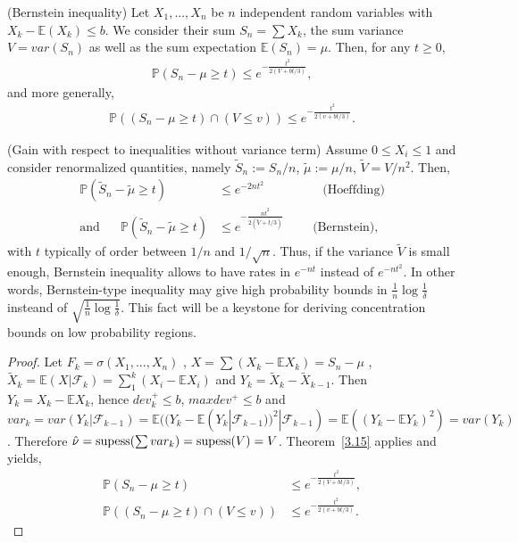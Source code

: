 \begin{proposition} ({\sc Bernstein inequality})
\label{Bernstein}
Let $X_1,...,X_n$ be $n$ independent random variables with $X_k-\mathbb{E}(X_k) \leq b$. We consider their sum $S_n=\sum X_k$, the sum variance $V=var(S_n)$ as well as the sum expectation $\mathbb{E}(S_n)=\mu$. Then, for any $t \ge 0$,
\begin{align*}
\mathbb{P}(S_n-\mu \geq t) \leq e^{-\frac{t^2}{2(V+bt/3)}},
\end{align*} 
and more generally,
\begin{align*}
\mathbb{P}((S_n-\mu \geq t)\cap(V \leq v)) \leq e^{-\frac{t^2}{2(v+bt/3)}}.
\end{align*} 
\end{proposition}

\begin{remark}({\sc Gain with respect to inequalities without variance term})
Assume $0 \le X_i \le 1$ and consider renormalized quantities, namely $\tilde S_n := S_n/n$, $\tilde \mu:= \mu/n$, $\tilde V = V/n^2$. Then,
\begin{align*}
\mathbb{P}(\tilde S_n-\tilde \mu \geq t) &\leq e^{-2nt^2} \text{~~~~~~~~~~~~~~(Hoeffding)}\\
\text{and~~~~~}\mathbb{P}(\tilde S_n-\tilde \mu \ge t) &\leq e^{-\frac{n t^2}{2(\tilde V+t/3)}} \text{~~~~~~~(Bernstein)},
\end{align*}
with $t$ typically of order between $1/n$ and $1/\sqrt n$. Thus, if the variance $\tilde V$ is small enough, Bernstein inequality allows to have rates in $e^{-nt}$ instead of $e^{-nt^2}$. In other words, Bernstein-type inequality may give high probability bounds in $\frac{1}{n}\log{\frac{1}{\delta}}$ insteand of $\sqrt{\frac{1}{n}\log{\frac{1}{\delta}}}$. This fact will be a keystone for deriving concentration bounds on low probability regions.%
\end{remark}

\begin{proof}
Let $F_k=\sigma(X_1,...,X_n)$ , $X=\sum (X_k-\mathbb{E}X_k) =S_n-\mu$ , $\tilde X_k=\mathbb{E}(X|\mathcal{F}_k)=\sum_{1}^{k}(X_i-\mathbb{E}X_i)$ and $Y_k=\tilde X_k - \tilde X_{k-1}$.
Then~ $Y_k= X_k-\mathbb{E}X_k$, hence  $dev_k^+ \leq b$, $maxdev^+ \leq b $ and $var_k=var(Y_k|\mathcal{F}_{k-1})=\mathbb{E}((Y_k-\mathbb{E}(Y_k|\mathcal{F}_{k-1}))^2|\mathcal{F}_{k-1})=\mathbb{E}((Y_k-\mathbb{E}Y_k)^2)=var(Y_k)$.
Therefore $\hat \nu = \supess(\sum var_k)=\supess(V)=V$. Theorem~\ref{3.15} applies and yields,
\begin{align*}
\mathbb{P}(S_n-\mu \geq t) &\leq e^{-\frac{t^2}{2(V+bt/3)}},\\
\mathbb{P}((S_n-\mu \geq t)\cap(V \leq v)) &\leq e^{-\frac{t^2}{2(v+bt/3)}}.
\end{align*}
 
\end{proof}

